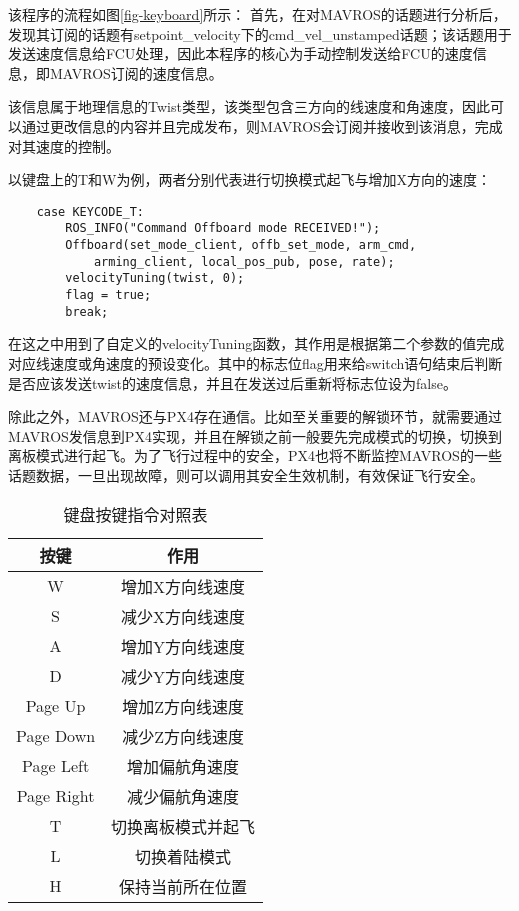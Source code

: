 该程序的流程如图\ref{fig-keyboard}所示：
首先，在对MAVROS的话题进行分析后，发现其订阅的话题有setpoint\_velocity下的cmd\_vel\_unstamped话题；该话题用于发送速度信息给FCU处理，因此本程序的核心为手动控制发送给FCU的速度信息，即MAVROS订阅的速度信息。

该信息属于地理信息的Twist类型，该类型包含三方向的线速度和角速度，因此可以通过更改信息的内容并且完成发布，则MAVROS会订阅并接收到该消息，完成对其速度的控制。

以键盘上的T和W为例，两者分别代表进行切换模式起飞与增加X方向的速度：

\begin{verbatim}
    case KEYCODE_T:
        ROS_INFO("Command Offboard mode RECEIVED!");
        Offboard(set_mode_client, offb_set_mode, arm_cmd,
            arming_client, local_pos_pub, pose, rate);
        velocityTuning(twist, 0);
        flag = true;
        break;
\end{verbatim}

在这之中用到了自定义的velocityTuning函数，其作用是根据第二个参数的值完成对应线速度或角速度的预设变化。其中的标志位flag用来给switch语句结束后判断是否应该发送twist的速度信息，并且在发送过后重新将标志位设为false。

除此之外，MAVROS还与PX4存在通信。比如至关重要的解锁环节，就需要通过MAVROS发信息到PX4实现，并且在解锁之前一般要先完成模式的切换，切换到离板模式进行起飞。为了飞行过程中的安全，PX4也将不断监控MAVROS的一些话题数据，一旦出现故障，则可以调用其安全生效机制，有效保证飞行安全。

\begin{table}[!htbp]
	\centering
	\caption{键盘按键指令对照表}\label{tab-keyboard}%
	\begin{tabular}{cc}
		\toprule
		按键& 作用\\
		\midrule
		W& 增加X方向线速度\\
		S& 减少X方向线速度\\
		A& 增加Y方向线速度\\
		D& 减少Y方向线速度\\
		
		Page Up    & 增加Z方向线速度\\
		Page Down  & 减少Z方向线速度\\
		Page Left  & 增加偏航角速度\\
		Page Right & 减少偏航角速度\\
		
		T & 切换离板模式并起飞\\
		L & 切换着陆模式\\
		H & 保持当前所在位置\\
		
		\bottomrule
	\end{tabular}
\end{table}

